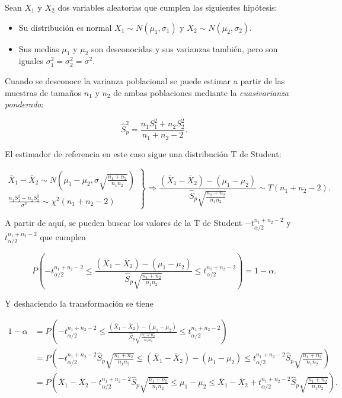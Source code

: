 \documentclass[
  a4paper,
]{scrreport}
\providecommand{\tightlist}{%
  \setlength{\itemsep}{0pt}\setlength{\parskip}{0pt}}\usepackage{longtable,booktabs,array}
\theoremstyle{plain}
\theoremstyle{definition}
\theoremstyle{definition}
\theoremstyle{remark}
\begin{document}
Sean \(X_1\) y \(X_2\) dos variables aleatorias que cumplen las
siguientes hipótesis:

\begin{itemize}
\tightlist
\item
  Su distribución es normal \(X_1\sim N(\mu_1,\sigma_1)\) y
  \(X_2\sim N(\mu_2,\sigma_2)\).
\item
  Sus medias \(\mu_1\) y \(\mu_2\) son desconocidas y sus varianzas
  también, pero son iguales \(\sigma^2_1=\sigma^2_2=\sigma^2\).
\end{itemize}

Cuando se desconoce la varianza poblacional se puede estimar a partir de
las muestras de tamaños \(n_1\) y \(n_2\) de ambas poblaciones mediante
la \emph{cuasivarianza ponderada}:

\[
\hat{S}^2_p = \frac{n_1S^2_1+n_2S^2_2}{n_1+n_2-2}.
\]

El estimador de referencia en este caso sigue una distribución T de
Student:

\[
\left.
\begin{array}{l}
\bar{X}_1-\bar{X}_2\sim N\left(\mu_1-\mu_2,\sigma\sqrt{\frac{n_1+n_2}{n_1n_2}} \right)\\
\displaystyle \frac{n_1S_1^2+n_2S_2^2}{\sigma^2} \sim \chi^2(n_1+n_2-2)
\end{array}
\right\}
\Rightarrow
\frac{(\bar{X}_1-\bar{X}_2)-(\mu_1-\mu_2)}{\hat{S}_p\sqrt{\frac{n_1+n_2}{n_1n_2}}} \sim T(n_1+n_2-2).
\]

A partir de aquí, se pueden buscar los valores de la T de Student
\(-t^{n_1+n_2-2}_{\alpha/2}\) y \(t^{n_1+n_2-2}_{\alpha/2}\) que cumplen

\[
P\left(-t^{n_1+n_2-2}_{\alpha/2}\leq \frac{(\bar{X}_1-\bar{X}_2)-(\mu_1-\mu_2)}{\hat{S}_p\sqrt{\frac{n_1+n_2}{n_1n_2}}}
\leq t^{n_1+n_2-2}_{\alpha/2}\right) = 1-\alpha.
\]

Y deshaciendo la transformación se tiene

\begin{align*}
1-\alpha 
&= P\left(-t^{n_1+n_2-2}_{\alpha/2}\leq \frac{(\bar{X}_1-\bar{X}_2)-(\mu_1-\mu_2)}{\hat{S}_p\sqrt{\frac{n_1+n_2}{n_1n_2}}} \leq t^{n_1+n_2-2}_{\alpha/2}\right) \\
&= P\left(-t^{n_1+n_2-2}_{\alpha/2}\hat{S}_p\sqrt{\frac{n_1+n_2}{n_1n_2}}\leq (\bar{X}_1-\bar{X}_2)-(\mu_1-\mu_2) \leq t^{n_1+n_2-2}_{\alpha/2}\hat{S}_p\sqrt{\frac{n_1+n_2}{n_1n_2}}\right) \\
&= P\left(\bar{X}_1-\bar{X}_2 - t^{n_1+n_2-2}_{\alpha/2}\hat{S}_p\sqrt{\frac{n_1+n_2}{n_1n_2}}\leq \mu_1-\mu_2 \leq \bar{X}_1-\bar{X}_2 + t^{n_1+n_2-2}_{\alpha/2}\hat{S}_p\sqrt{\frac{n_1+n_2}{n_1n_2}}\right).
\end{align*}
\end{document}
